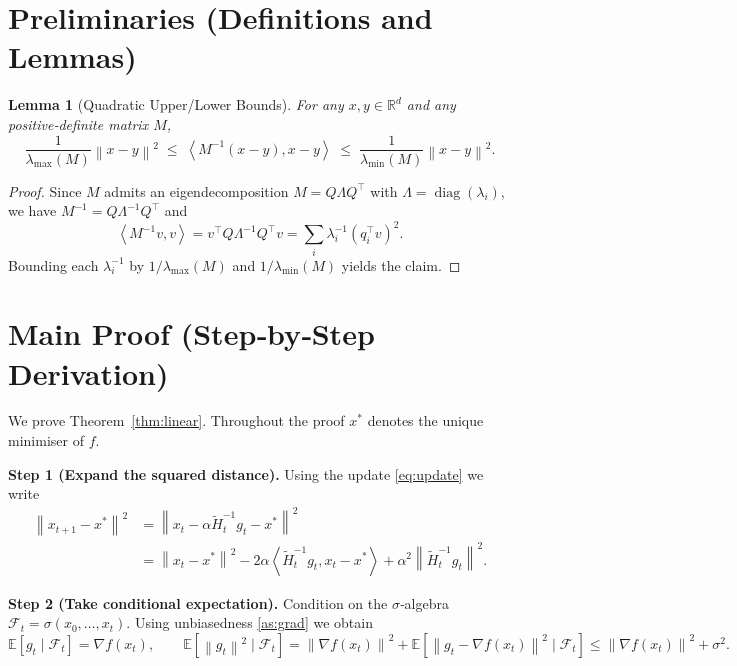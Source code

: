 \documentclass[11pt]{article}
\newtheorem{lemma}{Lemma}
\newcommand{\E}{\mathbb{E}}
\newcommand{\R}{\mathbb{R}}
\newcommand{\norm}[1]{\left\|#1\right\|}
\newcommand{\ip}[2]{\left\langle #1,#2\right\rangle}
\newcommand{\grad}{\nabla}
\begin{document}
\section*{Preliminaries (Definitions and Lemmas)}
\begin{lemma}[Quadratic Upper/Lower Bounds]\label{lem:quad}
For any $x,y\in\R^{d}$ and any positive‑definite matrix $M$,
\[
\frac{1}{\lambda_{\max}(M)}\norm{x-y}^{2}
\;\le\;
\ip{M^{-1}(x-y)}{x-y}
\;\le\;
\frac{1}{\lambda_{\min}(M)}\norm{x-y}^{2}.
\]
\end{lemma}
\begin{proof}
Since $M$ admits an eigendecomposition $M=Q\Lambda Q^{\top}$ with $\Lambda=\operatorname{diag}(\lambda_{i})$, we have $M^{-1}=Q\Lambda^{-1}Q^{\top}$ and
\[
\ip{M^{-1}v}{v}=v^{\top}Q\Lambda^{-1}Q^{\top}v
=\sum_{i}\lambda_{i}^{-1}(q_{i}^{\top}v)^{2}.
\]
Bounding each $\lambda_{i}^{-1}$ by $1/\lambda_{\max}(M)$ and $1/\lambda_{\min}(M)$ yields the claim. \qedhere
\end{proof}

\section*{Main Proof (Step‑by‑Step Derivation)}
We prove Theorem~\ref{thm:linear}. Throughout the proof $x^{*}$ denotes the unique minimiser of $f$.

\bigskip
\noindent\textbf{Step 1 (Expand the squared distance).}  
Using the update \eqref{eq:update} we write
\[
\begin{aligned}
\norm{x_{t+1}-x^{*}}^{2}
&=\norm{x_{t}-\alpha\widetilde H_{t}^{-1}g_{t}-x^{*}}^{2}\\
&=\norm{x_{t}-x^{*}}^{2}
-2\alpha\ip{\widetilde H_{t}^{-1}g_{t}}{x_{t}-x^{*}}
+\alpha^{2}\norm{\widetilde H_{t}^{-1}g_{t}}^{2}.
\end{aligned}
\tag{1}
\]
\label{step:expand}

\bigskip
\noindent\textbf{Step 2 (Take conditional expectation).}  
Condition on the $\sigma$‑algebra $\mathcal{F}_{t}=\sigma(x_{0},\dots,x_{t})$.  
Using unbiasedness \eqref{as:grad} we obtain
\[
\E\!\left[g_{t}\mid\mathcal{F}_{t}\right]=\grad f(x_{t}),\qquad
\E\!\left[\norm{g_{t}}^{2}\mid\mathcal{F}_{t}\right]
=\norm{\grad f(x_{t})}^{2}+\E\!\left[\norm{g_{t}-\grad f(x_{t})}^{2}\mid\mathcal{F}_{t}\right]
\le\norm{\grad f(x_{t})}^{2}+\sigma^{2}.
\tag{2}
\]
\label{step:expect}
\end{document}
